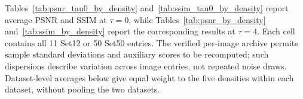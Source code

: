 \documentclass[pdflatex,iicol,sn-mathphys-num]{sn-jnl}
\newif\ifshowportuguese
\newcommand{\pt}[1]{\ifshowportuguese\par\begingroup\small\color{blue!55!black}\noindent\textbf{PT: }#1\par\endgroup\fi}
\begin{document}
Tables~\ref{tab:psnr_tau0_by_density} and~\ref{tab:ssim_tau0_by_density} report average PSNR and SSIM at $\tau=0$, while Tables~\ref{tab:psnr_by_density} and~\ref{tab:ssim_by_density} report the corresponding results at $\tau=4$. Each cell contains all 11 Set12 or 50 Set50 entries. The verified per-image archive permits sample standard deviations and auxiliary scores to be recomputed; such dispersions describe variation across image entries, not repeated noise draws. Dataset-level averages below give equal weight to the five densities within each dataset, without pooling the two datasets.
\pt{As Tabelas~\ref{tab:psnr_tau0_by_density} e~\ref{tab:ssim_tau0_by_density} apresentam as médias de PSNR e SSIM em $\tau=0$, enquanto as Tabelas~\ref{tab:psnr_by_density} e~\ref{tab:ssim_by_density} mostram os resultados correspondentes em $\tau=4$. Cada célula contém todas as 11 entradas do Set12 ou 50 do Set50. O arquivo verificado por imagem permite recalcular desvios padrão amostrais e scores auxiliares; essas dispersões descrevem a variação entre entradas de imagens, não sorteios repetidos do ruído. As médias por conjunto apresentadas a seguir atribuem pesos iguais às cinco densidades dentro de cada conjunto, sem agrupar os dois conjuntos.}
\end{document}
